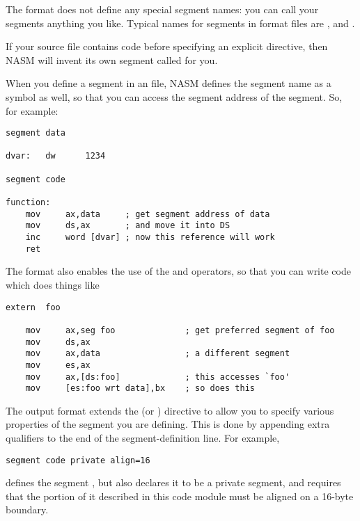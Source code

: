 The  format does not define any special segment names: you
can call your segments anything you like. Typical names for segments
in  format files are ,  and .

If your source file contains code before specifying an explicit
 directive, then NASM will invent its own segment called
 for you.

When you define a segment in an  file, NASM defines the
segment name as a symbol as well, so that you can access the segment
address of the segment. So, for example:

\begin{lstlisting}
segment data

dvar:   dw      1234

segment code

function:
    mov     ax,data     ; get segment address of data
    mov     ds,ax       ; and move it into DS
    inc     word [dvar] ; now this reference will work
    ret
\end{lstlisting}

The  format also enables the use of the 
and  operators, so that you can write code which
does things like

\begin{lstlisting}
extern  foo

    mov     ax,seg foo              ; get preferred segment of foo
    mov     ds,ax
    mov     ax,data                 ; a different segment
    mov     es,ax
    mov     ax,[ds:foo]             ; this accesses `foo'
    mov     [es:foo wrt data],bx    ; so does this
\end{lstlisting}


The  output format extends the  (or )
directive to allow you to specify various properties of the segment
you are defining. This is done by appending extra qualifiers to the
end of the segment-definition line. For example,

\begin{lstlisting}
segment code private align=16
\end{lstlisting}

defines the segment , but also declares it to be a private
segment, and requires that the portion of it described in this code
module must be aligned on a 16-byte boundary.

